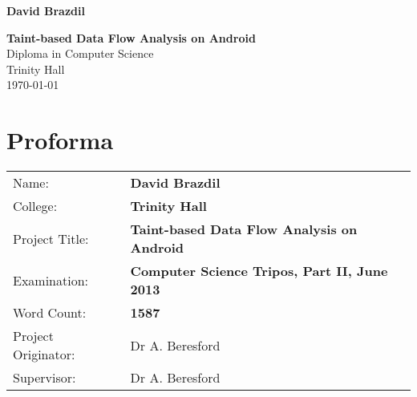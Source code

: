 \documentclass[12pt,twoside,notitlepage]{report}
\title{\strTitle}
\author{\strAuthor}
\newcommand{\strAuthor}{David Brazdil}
\newcommand{\strCollege}{Trinity Hall}
\newcommand{\strTitle}{Taint-based Data Flow Analysis on Android}
\newcommand{\strExamination}{Computer Science Tripos, Part II}
\newcommand{\strYear}{June 2013}
\newcommand{\strSupervisor}{Dr A. Beresford}
\begin{document}


\lstset{
	basicstyle=\small\upshape\ttfamily, %
	frame=single,
	escapeinside=\`\`, %
	captionpos=b
}



\pagestyle{empty}

\hfill{\LARGE \bf \strAuthor}

\vspace*{60mm}
\begin{center}
\Huge
{\bf \strTitle} \\
\vspace*{5mm}
Diploma in Computer Science \\
\vspace*{5mm}
Trinity Hall \\
\vspace*{5mm}
\today  %
\end{center}

\cleardoublepage


\setcounter{page}{1}
\pagestyle{plain}

\chapter*{Proforma}

{\large
\begin{tabular}{ll}
Name:               & \bf \strAuthor                       \\
College:            & \bf \strCollege                     \\
Project Title:      & \bf \strTitle \\
Examination:        & \bf \strExamination, \strYear        \\
Word Count:         & \bf 1587\footnotemark[1] \\
Project Originator: & \strSupervisor                    \\
Supervisor:         & \strSupervisor                    \\ 
\end{tabular}
}
\end{document}
